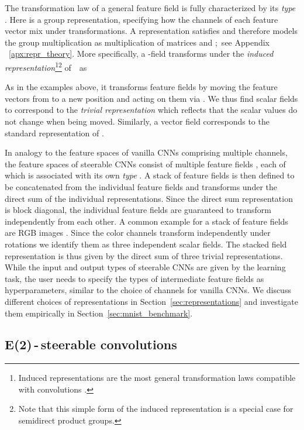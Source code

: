 \documentclass{article}
\newcommand{\apx}{Appendix\xspace
}
\newlength{\secBefore}
\newlength{\secAfter}
\newlength{\subsecBefore}
\newlength{\subsecAfter}
\begin{document}
The transformation law of a general feature field  is fully characterized by its \emph{type} .
Here  is a group representation, specifying how the  channels of each feature vector  mix under transformations.
A representation satisfies  and therefore models the group multiplication  as multiplication of  matrices  and ;~see \apx~\ref{apx:repr_theory}.
More specifically, a -field transforms under the \emph{induced representation}\footnote{
    Induced representations are the most general transformation laws compatible with convolutions \cite{Cohen2018-IIR,generaltheory}.
}\footnote{
    Note that this simple form of the induced representation is a special case for semidirect product groups.
}
 of~~as
\vspace*{-.2ex}
\vspace*{-.5ex}

As in the examples above, it transforms feature fields by moving the feature vectors from  to a new position  and acting on them via .
We thus find scalar fields to correspond to the \emph{trivial representation}  which reflects that the scalar values do not change when being moved.
Similarly, a vector field corresponds to the standard representation  of .

In analogy to the feature spaces of vanilla CNNs comprising multiple channels, the feature spaces of steerable CNNs consist of multiple feature fields , each of which is associated with its own \emph{type} .
A stack  of feature fields is then defined to be concatenated from the individual feature fields and transforms under the direct sum  of the individual representations.
Since the direct sum representation is block diagonal, the individual feature fields are guaranteed to transform independently from each other.
A common example for a stack of feature fields are RGB images .
Since the color channels transform independently under rotations we identify them as three independent scalar fields.
The stacked field representation is thus given by the direct sum  of three trivial representations.
While the input and output types of steerable CNNs are given by the learning task, the user needs to specify the types  of intermediate feature fields as hyperparameters, similar to the choice of channels for vanilla CNNs.
We discuss different choices of representations in Section~\ref{sec:representations} and investigate them empirically in Section~\ref{sec:mnist_benchmark}. 	

\vspace*{\subsecBefore}
\subsection{E(2)\,-\,steerable convolutions}
\label{sec:steerable_convolutions}
\vspace*{\subsecAfter}
\end{document}
